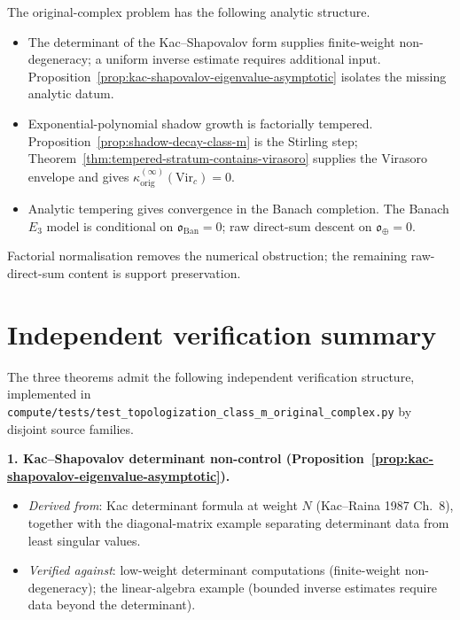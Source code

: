 \begin{remark}
\label{rem:first-principles-summary-original-complex}
The original-complex problem has the following analytic structure.
\begin{itemize}
\item The determinant of the Kac--Shapovalov form supplies
 finite-weight non-degeneracy; a uniform inverse estimate requires
 additional input.
 Proposition~\ref{prop:kac-shapovalov-eigenvalue-asymptotic}
 isolates the missing analytic datum.
\item Exponential-polynomial shadow growth is factorially tempered.
 Proposition~\ref{prop:shadow-decay-class-m} is the Stirling step;
 Theorem~\ref{thm:tempered-stratum-contains-virasoro} supplies the
 Virasoro envelope and gives
 $\kappa^{(\infty)}_{\mathrm{orig}}(\mathrm{Vir}_c)=0$.
\item Analytic tempering gives convergence in the Banach completion.
 The Banach $E_3$ model is conditional on
 $\mathfrak{o}_{\mathrm{Ban}}=0$; raw direct-sum descent on
 $\mathfrak{o}_{\oplus}=0$.
\end{itemize}
Factorial normalisation removes the numerical obstruction; the
remaining raw-direct-sum content is support preservation.
\end{remark}

\section{Independent verification summary}
\label{sec:original-complex-iv-summary}

The three theorems admit the following independent verification
structure, implemented in
\texttt{compute/tests/test\_topologization\_class\_m\_original\_complex.py}
by disjoint source families.

\textbf{1. Kac--Shapovalov determinant non-control
(Proposition~\ref{prop:kac-shapovalov-eigenvalue-asymptotic}).}
\begin{itemize}[nosep]
\item \emph{Derived from}: Kac determinant formula at weight $N$
 (Kac--Raina 1987 Ch.~8), together with the diagonal-matrix
 example separating determinant data from least singular values.
\item \emph{Verified against}: low-weight determinant computations
 (finite-weight non-degeneracy); the linear-algebra example
 (bounded inverse estimates require data beyond the determinant).
\end{itemize}

